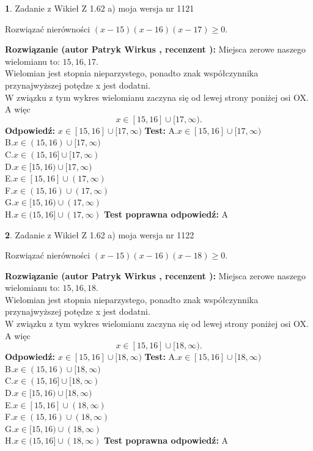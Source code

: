 \documentclass[12pt, a4paper]{article}
\theoremstyle{definition} %
\newtheorem{zad}{}
\newcommand{\zadStart}[1]{\begin{zad}#1\newline}
\newcommand{\zadStop}{\end{zad}}
\newcommand{\rozwStart}[2]{\noindent \textbf{Rozwiązanie (autor #1 , recenzent #2): }\newline}
\newcommand{\rozwStop}{\newline}
\newcommand{\odpStart}{\noindent \textbf{Odpowiedź:}\newline}
\newcommand{\odpStop}{\newline}
\newcommand{\testStart}{\noindent \textbf{Test:}\newline}
\newcommand{\testStop}{\newline}
\newcommand{\kluczStart}{\noindent \textbf{Test poprawna odpowiedź:}\newline}
\newcommand{\kluczStop}{\newline}
\begin{document}
\zadStart{Zadanie z Wikieł Z 1.62 a) moja wersja nr 1121}

Rozwiązać nierówności $(x-15)(x-16)(x-17)\ge0$.
\zadStop
\rozwStart{Patryk Wirkus}{}
Miejsca zerowe naszego wielomianu to: $15, 16, 17$.\\
Wielomian jest stopnia nieparzystego, ponadto znak współczynnika przy\linebreak najwyższej potędze x jest dodatni.\\ W związku z tym wykres wielomianu zaczyna się od lewej strony poniżej osi OX. A więc $$x \in [15,16] \cup [17,\infty).$$
\rozwStop
\odpStart
$x \in [15,16] \cup [17,\infty)$
\odpStop
\testStart
A.$x \in [15,16] \cup [17,\infty)$\\
B.$x \in (15,16) \cup [17,\infty)$\\
C.$x \in (15,16] \cup [17,\infty)$\\
D.$x \in [15,16) \cup [17,\infty)$\\
E.$x \in [15,16] \cup (17,\infty)$\\
F.$x \in (15,16) \cup (17,\infty)$\\
G.$x \in [15,16) \cup (17,\infty)$\\
H.$x \in (15,16] \cup (17,\infty)$
\testStop
\kluczStart
A
\kluczStop



\zadStart{Zadanie z Wikieł Z 1.62 a) moja wersja nr 1122}

Rozwiązać nierówności $(x-15)(x-16)(x-18)\ge0$.
\zadStop
\rozwStart{Patryk Wirkus}{}
Miejsca zerowe naszego wielomianu to: $15, 16, 18$.\\
Wielomian jest stopnia nieparzystego, ponadto znak współczynnika przy\linebreak najwyższej potędze x jest dodatni.\\ W związku z tym wykres wielomianu zaczyna się od lewej strony poniżej osi OX. A więc $$x \in [15,16] \cup [18,\infty).$$
\rozwStop
\odpStart
$x \in [15,16] \cup [18,\infty)$
\odpStop
\testStart
A.$x \in [15,16] \cup [18,\infty)$\\
B.$x \in (15,16) \cup [18,\infty)$\\
C.$x \in (15,16] \cup [18,\infty)$\\
D.$x \in [15,16) \cup [18,\infty)$\\
E.$x \in [15,16] \cup (18,\infty)$\\
F.$x \in (15,16) \cup (18,\infty)$\\
G.$x \in [15,16) \cup (18,\infty)$\\
H.$x \in (15,16] \cup (18,\infty)$
\testStop
\kluczStart
A
\kluczStop
\end{document}
